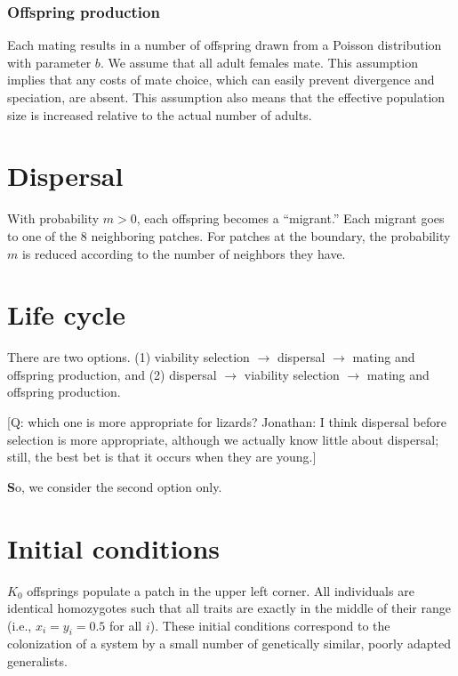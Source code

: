 \documentclass{article}
\begin{document}
\subsubsection{Offspring production}

Each mating results in a number of offspring drawn from a Poisson distribution with parameter $b$.
We assume that all adult females mate. This assumption implies that any costs of mate choice,
which can easily prevent divergence and speciation, are absent.
This assumption also means that the effective population size is increased relative to the actual
number of adults.


\section{Dispersal}

With probability $m>0$, each offspring becomes a ``migrant.''
Each migrant goes to one of the 8 neighboring patches.
For patches at the boundary, the probability $m$ is reduced according to the number of neighbors they have.


\section{Life cycle}

There are two options. (1) viability selection $\rightarrow$ dispersal
$\rightarrow$ mating and offspring production, and (2) dispersal
$\rightarrow$ viability selection $\rightarrow$ mating and offspring production.

{\footnotesize [Q: which one is more appropriate for lizards?
Jonathan: I think dispersal before selection is more appropriate,
although we actually know little about dispersal;
still, the best bet is that it occurs when they are young.]}

{\textbf So}, we consider the second option only.


\section{Initial conditions}

$K_0$ offsprings populate a patch in the upper left corner.
All individuals are identical homozygotes such that all traits are exactly in the middle of their range (i.e., $x_i=y_i=0.5$ for all $i$).
These initial conditions correspond to the colonization of a system by a small number of genetically similar, poorly adapted generalists.
\end{document}
